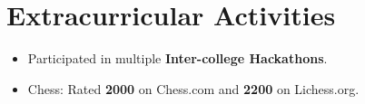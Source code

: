 \documentclass[a4paper,10pt]{article}
\begin{document}
\section{Extracurricular Activities}
\begin{itemize}[leftmargin=*]
  \item Participated in multiple \textbf{Inter-college Hackathons}.
  \item Chess: Rated \textbf{2000} on Chess.com and \textbf{2200} on Lichess.org.
\end{itemize}
\end{document}
